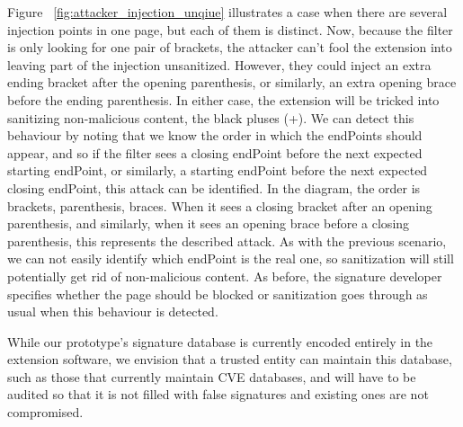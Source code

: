 Figure ~\ref{fig:attacker_injection_unqiue} illustrates a case when there are several injection points in one page, but each of them is distinct. Now, because the filter is only looking for one pair of brackets, the attacker can't fool the extension into leaving part of the injection unsanitized. However, they could inject an extra ending bracket after the opening parenthesis, or similarly, an extra opening brace before the ending parenthesis. In either case, the extension will be tricked into sanitizing non-malicious content, the black pluses (+). We can detect this behaviour by noting that we know the order in which the endPoints should appear, and so if the filter sees a closing endPoint before the next expected starting endPoint, or similarly, a starting endPoint before the next expected closing endPoint, this attack can be identified. In the diagram, the order is brackets, parenthesis, braces. When it sees a closing bracket after an opening parenthesis, and similarly, when it sees an opening brace before a closing parenthesis, this represents the described attack. As with the previous scenario, we can not easily identify which endPoint is the real one, so sanitization will still potentially get rid of non-malicious content. As before, the signature developer specifies whether the page should be blocked or sanitization goes through as usual when this behaviour is detected.

While our prototype's signature database is currently encoded entirely in the extension software, we envision that a trusted entity can maintain this database, such as those that currently maintain CVE databases, and will have to be audited so that it is not filled with false signatures and existing ones are not compromised.